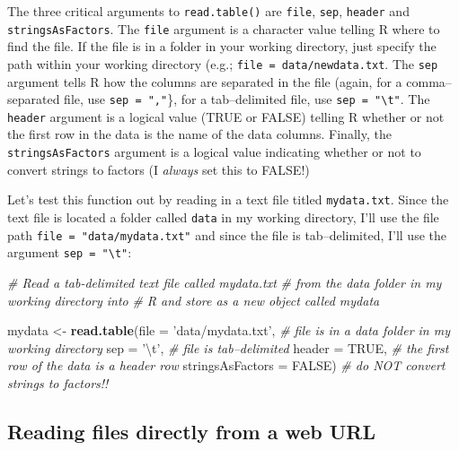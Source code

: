 \documentclass[]{book}
\newenvironment{Shaded}{\begin{snugshade}}{\end{snugshade}}
\newcommand{\KeywordTok}[1]{\textcolor[rgb]{0.13,0.29,0.53}{\textbf{#1}}}
\newcommand{\DataTypeTok}[1]{\textcolor[rgb]{0.13,0.29,0.53}{#1}}
\newcommand{\CharTok}[1]{\textcolor[rgb]{0.31,0.60,0.02}{#1}}
\newcommand{\StringTok}[1]{\textcolor[rgb]{0.31,0.60,0.02}{#1}}
\newcommand{\CommentTok}[1]{\textcolor[rgb]{0.56,0.35,0.01}{\textit{#1}}}
\newcommand{\OtherTok}[1]{\textcolor[rgb]{0.56,0.35,0.01}{#1}}
\newcommand{\NormalTok}[1]{#1}
\theoremstyle{definition}
\theoremstyle{definition}
\theoremstyle{remark}
\begin{document}
The three critical arguments to \texttt{read.table()} are \texttt{file},
\texttt{sep}, \texttt{header} and \texttt{stringsAsFactors}. The
\texttt{file} argument is a character value telling R where to find the
file. If the file is in a folder in your working directory, just specify
the path within your working directory (e.g.;
\texttt{file\ =\ data/newdata.txt}. The \texttt{sep} argument tells R
how the columns are separated in the file (again, for a comma--separated
file, use \texttt{sep\ =\ ","}\}, for a tab--delimited file, use
\texttt{sep\ =\ "\textbackslash{}t"}. The \texttt{header} argument is a
logical value (TRUE or FALSE) telling R whether or not the first row in
the data is the name of the data columns. Finally, the
\texttt{stringsAsFactors} argument is a logical value indicating whether
or not to convert strings to factors (I \emph{always} set this to
FALSE!)

Let's test this function out by reading in a text file titled
\texttt{mydata.txt}. Since the text file is located a folder called
\texttt{data} in my working directory, I'll use the file path
\texttt{file\ =\ "data/mydata.txt"} and since the file is
tab--delimited, I'll use the argument
\texttt{sep\ =\ "\textbackslash{}t"}:

\begin{Shaded}
\begin{Highlighting}[]
\CommentTok{# Read a tab-delimited text file called mydata.txt }
\CommentTok{#  from the data folder in my working directory into}
\CommentTok{#  R and store as a new object called mydata}

\NormalTok{mydata <-}\StringTok{ }\KeywordTok{read.table}\NormalTok{(}\DataTypeTok{file =} \StringTok{'data/mydata.txt'}\NormalTok{,    }\CommentTok{# file is in a data folder in my working directory}
                     \DataTypeTok{sep =} \StringTok{'}\CharTok{\textbackslash{}t}\StringTok{'}\NormalTok{,                  }\CommentTok{# file is tab--delimited}
                     \DataTypeTok{header =} \OtherTok{TRUE}\NormalTok{,               }\CommentTok{# the first row of the data is a header row}
                     \DataTypeTok{stringsAsFactors =} \OtherTok{FALSE}\NormalTok{)    }\CommentTok{# do NOT convert strings to factors!!}
\end{Highlighting}
\end{Shaded}

\subsection{Reading files directly from a web
URL}\label{reading-files-directly-from-a-web-url}
\end{document}
